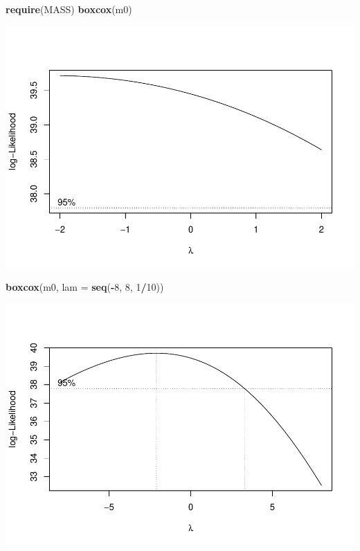 \documentclass[
]{book}
\newenvironment{Shaded}{\begin{snugshade}}{\end{snugshade}}
\newcommand{\DataTypeTok}[1]{\textcolor[rgb]{0.13,0.29,0.53}{#1}}
\newcommand{\DecValTok}[1]{\textcolor[rgb]{0.00,0.00,0.81}{#1}}
\newcommand{\KeywordTok}[1]{\textcolor[rgb]{0.13,0.29,0.53}{\textbf{#1}}}
\newcommand{\NormalTok}[1]{#1}
\newcommand{\OperatorTok}[1]{\textcolor[rgb]{0.81,0.36,0.00}{\textbf{#1}}}
\begin{document}
\begin{Shaded}
\begin{Highlighting}[]
\KeywordTok{require}\NormalTok{(MASS) }
  \KeywordTok{boxcox}\NormalTok{(m0)}
\end{Highlighting}
\end{Shaded}

\includegraphics{TudodoR_files/figure-latex/unnamed-chunk-291-1.pdf}

\begin{Shaded}
\begin{Highlighting}[]
  \KeywordTok{boxcox}\NormalTok{(m0, }\DataTypeTok{lam =} \KeywordTok{seq}\NormalTok{(}\OperatorTok{-}\DecValTok{8}\NormalTok{, }\DecValTok{8}\NormalTok{, }\DecValTok{1}\OperatorTok{/}\DecValTok{10}\NormalTok{))}
\end{Highlighting}
\end{Shaded}

\includegraphics{TudodoR_files/figure-latex/unnamed-chunk-291-2.pdf}
\end{document}
